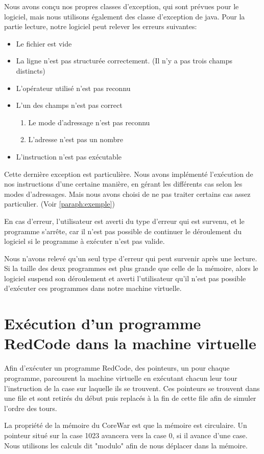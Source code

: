 \documentclass[hidelinks]{report}
\begin{document}
Nous avons conçu nos propres classes d'exception, qui sont prévues pour le logiciel, mais nous utilisons également des classe d'exception de java. Pour la partie lecture, notre logiciel peut relever les erreurs suivantes:
\begin{itemize}
    \item Le fichier est vide
    \item La ligne n'est pas structurée correctement. (Il n'y a pas trois champs distincts)
    \item L'opérateur utilisé n'est pas reconnu
    \item L'un des champs n'est pas correct
    \begin{enumerate}[label=(\alph*)]
        \item Le mode d'adressage n'est pas reconnu
        \item L'adresse n'est pas un nombre
    \end{enumerate}
    \item L'instruction n'est pas exécutable
\end{itemize}
Cette dernière exception est particulière. Nous avons implémenté l'exécution de nos instructions d'une certaine manière, en gérant les différents cas selon les modes d'adressages. Mais nous avons choisi de ne pas traiter certains cas assez particulier. (Voir \autoref{paraph:exemple})

En cas d'erreur, l'utilisateur est averti du type d'erreur qui est survenu, et le programme s'arrête, car il n'est pas possible de continuer le déroulement du logiciel si le programme à exécuter n'est pas valide.

Nous n'avons relevé qu'un seul type d'erreur qui peut survenir après une lecture. Si la taille des deux programmes est plus grande que celle de la mémoire, alors le logiciel suspend son déroulement et averti l'utilisateur qu'il n'est pas possible d'exécuter ces programmes dans notre machine virtuelle.
\section{Exécution d'un programme RedCode dans la machine virtuelle}
Afin d'exécuter un programme RedCode, des pointeurs, un pour chaque programme, parcourent la machine virtuelle en exécutant chacun leur tour l'instruction de la case sur laquelle ils se trouvent. Ces pointeurs se trouvent dans une file et sont retirés du début puis replacés à la fin de cette file afin de simuler l'ordre des tours.

La propriété de la mémoire du CoreWar est que la mémoire est circulaire. Un pointeur situé sur la case 1023 avancera vers la case 0, si il avance d'une case. Nous utilisons les calculs dit "modulo" afin de nous déplacer dans la mémoire.
\end{document}
